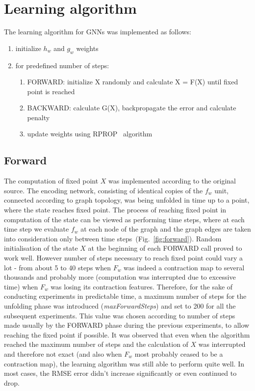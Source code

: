 \documentclass[]{spie}  %
\begin{document}
\section{Learning algorithm}
The learning algorithm for GNNs was implemented as follows:
\begin{enumerate}
	\item initialize $h_w$ and $g_w$ weights
	\item for predefined number of steps:
	\begin{enumerate}
		\item FORWARD: initialize X randomly and calculate X = F(X) until fixed point is reached
		\item BACKWARD: calculate G(X), backpropagate the error and calculate penalty
		\item update weights using RPROP~\cite{riedmiller1993direct} algorithm
	\end{enumerate}
\end{enumerate}

\subsection{Forward}
The computation of fixed point $X$ was implemented according to the original source. The encoding network, consisting of identical copies of the $f_w$ unit, connected according to graph topology, was being unfolded in time up to a point, where the state reaches fixed point. The process of reaching fixed point in computation of the state can be viewed as performing time steps, where at each time step we evaluate $f_w$ at each node of the graph and the graph edges are taken into consideration only between time steps~(Fig.~\ref{fig:forward}). Random initialisation of the state $X$ at the beginning of each FORWARD call proved to work well. However number of steps necessary to reach fixed point could vary a lot - from about 5 to 40 steps when $F_w$ was indeed a contraction map to several thousands and probably more (computation was interrupted due to excessive time) when $F_w$ was losing its contraction features. Therefore, for the sake of conducting experiments in predictable time, a maximum number of steps for the unfolding phase was introduced (\emph{maxForwardSteps}) and set to 200 for all the subsequent experiments. This value was chosen according to number of steps made usually by the FORWARD phase during the previous experiments, to allow reaching the fixed point if possible. It was observed that even when the algorithm reached the maximum number of steps and the calculation of $X$ was interrupted and therefore not exact (and also when $F_w$ most probably ceased to be a contraction map), the learning algorithm was still able to perform quite well. In most cases, the RMSE error didn't increase significantly or even continued to drop.
\end{document}

